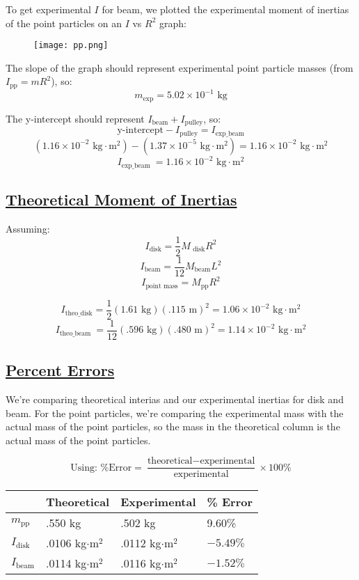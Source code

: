 \documentclass[fleqn]{article}
\begin{document}
To get experimental $I$ for beam, we plotted the experimental moment of inertias of the point particles on an $I$ vs $R^2$ graph:

\begin{figure}[H]
	\texttt{[image: pp.png]}
\end{figure}

The slope of the graph should represent experimental point particle masses (from $I _{\text{pp} } = mR^2$), so:
\[ m _{\text{exp} } = 5.02 \times 10^{-1} \text{ kg}   \]

The y-intercept should represent $I _{\text{beam} } + I _{\text{pulley} } $,
so:
\[\text{y-intercept} -I _{\text{pulley} } = I _{\text{exp\_beam} }  \]
\[ \left(1.16 \times 10^{-2} \text{ kg$\cdot$m$^2$} \right)-
	\left( 1.37 \times 10^{-5} \text{ kg$\cdot$m$^2$}   \right)
	= 1.16 \times 10^{-2} \text{ kg$\cdot$m$^2$}
\]
\[ I _{\text{exp\_beam } } =  1.16 \times 10^{-2} \text{ kg$\cdot$m$^2$}
\]

\subsection*{\underline{Theoretical Moment of Inertias}}
Assuming:
\[ I _{\text{disk} } =\frac{1}{2} M _{\text{ disk} } R^2 \]
\[ I _{\text{beam} } = \frac{1}{12} M _{\text{beam} } L^2 \]
\[ I _{\text{point mass} } = M _{\text{pp} } R^2 \]

\[ I _{\text{theo\_disk}} = \frac{1}{2} \left( 1.61 \text{ kg}  \right) \left( .115 \text{ m}  \right)^2=
	1.06 \times 10^{-2} \text{ kg$\cdot$m$^2$}
\]
\[ I _{\text{theo\_beam } }  = \frac{1}{12} \left( .596 \text{ kg}  \right)
	\left( .480 \text{ m}  \right)^2
	= 1.14 \times 10^{-2} \text{ kg$\cdot$m$^2$}
\]

\subsection*{\underline{Percent Errors}}
We're comparing theoretical interias and our experimental inertias for disk and beam. For the point particles, we're comparing the experimental mass with the actual mass of the point particles, so the mass in the theoretical column is the actual mass of the point particles.

\[ \text{Using: \% Error}  = \frac{\text{theoretical} - \text{experimental} }{\text{experimental} } \times 100 \%  \]

\begin{table}[H]
	\setlength{\extrarowheight}{2pt}
	\centering
	\begin{tabularx}{\textwidth}{|X|X|X|X|}
		\hline
		                      & Theoretical          & Experimental         & \% Error   \\
		\hline
		$m _{\text{pp} } $    & .550 kg              & .502 kg              & 9.60\%     \\
		\hline
		$I _{\text{disk} }  $ & .0106 kg$\cdot$m$^2$ & .0112 kg$\cdot$m$^2$ & $-5.49 \%$ \\
		\hline
		$I _{\text{beam} }$   & .0114 kg$\cdot$m$^2$ & .0116 kg$\cdot$m$^2$ & $-1.52 \%$ \\
		\hline
	\end{tabularx}
\end{table}
\end{document}
